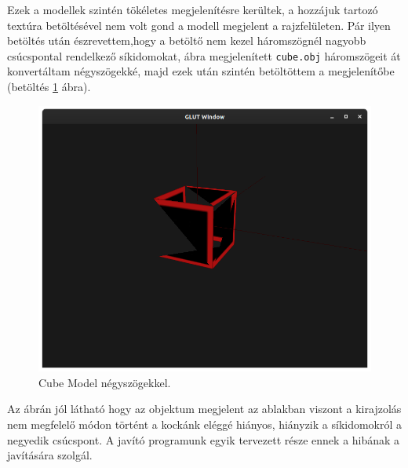 Ezek a modellek szintén tökéletes megjelenítésre kerültek, a hozzájuk tartozó textúra betöltésével nem volt gond a modell megjelent a rajzfelületen.
\newpage
Pár ilyen betöltés után észrevettem,hogy a betöltő nem kezel háromszögnél nagyobb csúcspontal rendelkező síkidomokat,   ábra megjelenített \texttt{cube.obj} háromszögeit át konvertáltam négyszögekké, majd ezek után szintén betöltöttem a megjelenítőbe (betöltés \ref{fig:model2} ábra).
\bigskip
\begin{figure}[h]
\centering
\includegraphics[width=\textwidth]{images/Model_quads.png}
\caption{Cube Model négyszögekkel.}
\label{fig:model2}
\end{figure}
\bigskip

Az ábrán jól látható hogy az objektum megjelent az ablakban viszont a kirajzolás nem megfelelő módon történt a kockánk eléggé hiányos, hiányzik a síkidomokról a negyedik csúcspont. A javító programunk egyik tervezett része ennek a hibának a javítására szolgál.

